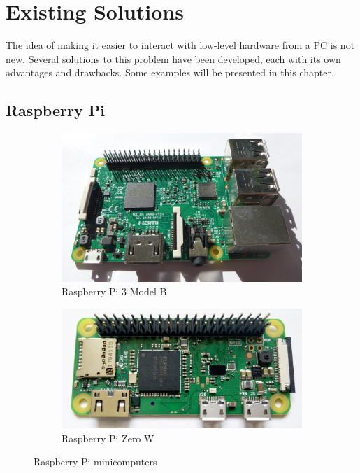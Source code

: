 \chapter{Existing Solutions}\label{sec:prior_art}

The idea of making it easier to interact with low-level hardware from a \gls{PC} is not new. Several solutions to this problem have been developed, each with its own advantages and drawbacks. Some examples will be presented in this chapter.

\section{Raspberry Pi}

\begin{figure}[H]
	\centering
	\begin{subfigure}{.5\textwidth}
		\centering
		\includegraphics[width=.95\textwidth] {img/pi3-photo.jpg}
		\caption{Raspberry Pi 3 Model B}
	\end{subfigure}%
	\begin{subfigure}{.5\textwidth}
		\centering
		\includegraphics[width=.95\textwidth] {img/pi0.jpg}
		\caption{Raspberry Pi Zero W}
	\end{subfigure}
	\caption{\label{fig:rpi}Raspberry Pi minicomputers}
\end{figure}

